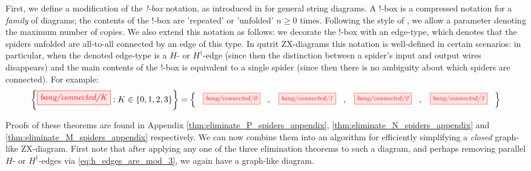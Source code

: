 First, we define a modification of the \emph{!-box} notation,
as introduced in \cite{dixon2009graphical} for general string diagrams. A !-box is a compressed notation for a \emph{family} of diagrams; the contents of the !-box
are 'repeated' or 'unfolded' $n\geq 0$ times.
Following the style of \cite{backens2018zh}, we allow a parameter denoting the maximum number of copies.
We also extend this notation as follows: we decorate the !-box with an edge-type, which denotes that the spiders unfolded are all-to-all connected by an edge of this type. In qutrit ZX-diagrams this notation is well-defined in certain scenarios: in particular, when the denoted edge-type is a $H$- or $H^{\dagger}$-edge (since then the distinction between a spider's input and output wires disappears) and the main contents of the !-box is equivalent to a single spider (since then there is no ambiguity about which spiders are connected). For example:
\begin{equation*}
	\left\{ \tikzfig{bang/connected/K} : K \in \{0, 1, 2, 3\} \right\} =
	\left\{ ~
		\scalebox{0.8}{\tikzfig{bang/connected/0}} \ , \
		\scalebox{0.8}{\tikzfig{bang/connected/1}} \ , \
		\scalebox{0.8}{\tikzfig{bang/connected/2}} \ , \
		\scalebox{0.8}{\tikzfig{bang/connected/3}}
	~ \right\}
\end{equation*}
\begin{theorem}\label{thm:eliminate_P_spiders}
	\eliminatePSpidersStatement
\end{theorem}
\begin{theorem}\label{thm:eliminate_N_spiders}
	\eliminateNSpidersStatement
\end{theorem}
\begin{theorem}\label{thm:eliminate_M_spiders}
	\eliminateMSpidersStatement
\end{theorem}

Proofs of these theorems are found in Appendix \ref{thm:eliminate_P_spiders_appendix}, \ref{thm:eliminate_N_spiders_appendix} and \ref{thm:eliminate_M_spiders_appendix} respectively. We can now combine them into an algorithm for efficiently simplifying a \emph{closed} graph-like ZX-diagram. First note that after applying any one of the three elimination theorems to such a diagram, and perhaps removing parallel $H$- or $H^\dagger$-edges via \eqref{eq:h_edges_are_mod_3}, we again have a graph-like diagram.

